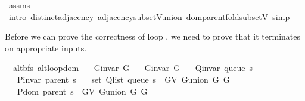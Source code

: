 \begin{isabellebody}
\isamarkupfalse%
\ assms\isanewline
\ \ \isamarkupfalse%
\ {\isacharparenleft}{\kern0pt}intro\ distinct{\isacharunderscore}{\kern0pt}adjacency\ adjacency{\isacharunderscore}{\kern0pt}subset{\isacharunderscore}{\kern0pt}V{\isacharunderscore}{\kern0pt}union\ dom{\isacharunderscore}{\kern0pt}parent{\isacharunderscore}{\kern0pt}fold{\isacharunderscore}{\kern0pt}subset{\isacharunderscore}{\kern0pt}V{\isacharparenright}{\kern0pt}\ simp{\isacharplus}{\kern0pt}%
\endisatagproof
{\isafoldproof}%
%
\isadelimproof
%
\endisadelimproof
%
\isadelimdocument
%
\endisadelimdocument
%
\isatagdocument
%
\isamarkuptrue%
%
\endisatagdocument
{\isafolddocument}%
%
\isadelimdocument
%
\endisadelimdocument
%
\begin{isamarkuptext}%
Before we can prove the correctness of loop , we need to prove that it
terminates on appropriate inputs.%
\end{isamarkuptext}\isamarkuptrue%
\isamarkupfalse%
\ {\isacharparenleft}{\kern0pt}\ alt{\isacharunderscore}{\kern0pt}bfs{\isacharparenright}{\kern0pt}\ alt{\isacharunderscore}{\kern0pt}loop{\isacharunderscore}{\kern0pt}dom{\isacharcolon}{\kern0pt}\isanewline
\ \ \ {\isachardoublequoteopen}G{\isachardot}{\kern0pt}invar\ G{}{\isachardoublequoteclose}\isanewline
\ \ \ {\isachardoublequoteopen}G{\isachardot}{\kern0pt}invar\ G{}{\isachardoublequoteclose}\isanewline
\ \ \ {\isachardoublequoteopen}Q{\isacharunderscore}{\kern0pt}invar\ {\isacharparenleft}{\kern0pt}queue\ s{\isacharparenright}{\kern0pt}{\isachardoublequoteclose}\isanewline
\ \ \ {\isachardoublequoteopen}P{\isacharunderscore}{\kern0pt}invar\ {\isacharparenleft}{\kern0pt}parent\ s{\isacharparenright}{\kern0pt}{\isachardoublequoteclose}\isanewline
\ \ \ {\isachardoublequoteopen}set\ {\isacharparenleft}{\kern0pt}Q{\isacharunderscore}{\kern0pt}list\ {\isacharparenleft}{\kern0pt}queue\ s{\isacharparenright}{\kern0pt}{\isacharparenright}{\kern0pt}\ {\isasymsubseteq}\ G{\isachardot}{\kern0pt}V\ {\isacharparenleft}{\kern0pt}G{\isachardot}{\kern0pt}union\ G{}\ G{}{\isacharparenright}{\kern0pt}{\isachardoublequoteclose}\isanewline
\ \ \ {\isachardoublequoteopen}P{\isachardot}{\kern0pt}dom\ {\isacharparenleft}{\kern0pt}parent\ s{\isacharparenright}{\kern0pt}\ {\isasymsubseteq}\ G{\isachardot}{\kern0pt}V\ {\isacharparenleft}{\kern0pt}G{\isachardot}{\kern0pt}union\ G{}\ G{}{\isacharparenright}{\kern0pt}{\isachardoublequoteclose}\isanewline

\end{isabellebody}
